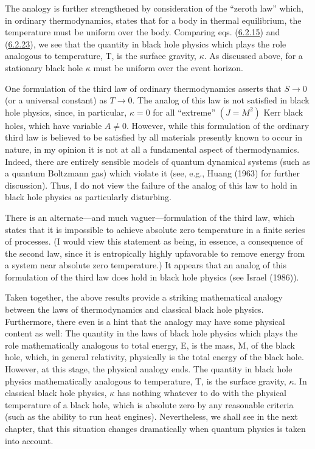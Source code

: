 \documentclass[11pt,a4paper]{article}
\begin{document}
The analogy is further strengthened by consideration of the ``zeroth law'' which, in ordinary thermodynamics, states that for a body in thermal equilibrium, the temperature must be uniform over the body. Comparing eqs. (\hyperref[eq:6.2.15]{6.2.15}) and (\hyperref[eq:6.2.23]{6.2.23}), we see that the quantity in black hole physics which plays the role analogous to temperature, T, is the surface gravity, \(\kappa\). As discussed above, for a stationary black hole \(\kappa\) must be uniform over the event horizon.

One formulation of the third law of ordinary thermodynamics asserts that \(S \rightarrow 0\) (or a universal constant) as \(T \rightarrow 0\). The analog of this law is not satisfied in black hole physics, since, in particular, \(\kappa = 0\) for all ``extreme'' \((J = M^2)\) Kerr black holes, which have variable \(A \neq 0\). However, while this formulation of the ordinary third law is believed to be satisfied by all materials presently known to occur in nature, in my opinion it is not at all a fundamental aspect of thermodynamics. Indeed, there are entirely sensible models of quantum dynamical systems (such as a quantum Boltzmann gas) which violate it (see, e.g., Huang (1963) for further discussion). Thus, I do not view the failure of the analog of this law to hold in black hole physics as particularly disturbing.

There is an alternate---and much vaguer---formulation of the third law, which states that it is impossible to achieve absolute zero temperature in a finite series of processes. (I would view this statement as being, in essence, a consequence of the second law, since it is entropically highly upfavorable to remove energy from a system near absolute zero temperature.) It appears that an analog of this formulation of the third law does hold in black hole physics (see Israel (1986)).

Taken together, the above results provide a striking mathematical analogy between the laws of thermodynamics and classical black hole physics. Furthermore, there even is a hint that the analogy may have some physical content as well: The quantity in the laws of black hole physics which plays the role mathematically analogous to total energy, E, is the mass, M, of the black hole, which, in general relativity, physically is the total energy of the black hole. However, at this stage, the physical analogy ends. The quantity in black hole physics mathematically analogous to temperature, T, is the surface gravity, \(\kappa\). In classical black hole physics, \(\kappa\) has nothing whatever to do with the physical temperature of a black hole, which is absolute zero by any reasonable criteria (such as the ability to \hypertarget{source-163}{} run heat engines). Nevertheless, we shall see in the next chapter, that this situation changes dramatically when quantum physics is taken into account.
\end{document}
